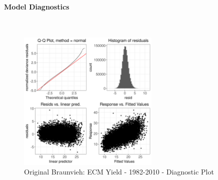 \paragraph{Model Diagnostics} \quad \\
\begin{figure}[H]
    \centering
    \includegraphics[width=0.6\textwidth]{thesis/figures/models/ecm/before2010/ob_ecm_before2010/ob_ecm_before2010_diagnostics.png}
    \caption[]{Original Braunvieh: ECM Yield - 1982-2010 - Diagnostic Plot}
\end{figure}

\newpage
